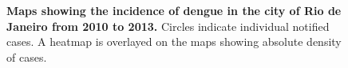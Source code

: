 \begin{figure}
  \caption{{\bf Maps showing the incidence of dengue in the city of Rio de 
Janeiro from 2010 to 2013.} Circles indicate individual notified cases. A 
heatmap is overlayed on the maps showing absolute density of cases.}
  \label{fig:mapas}
\end{figure}


